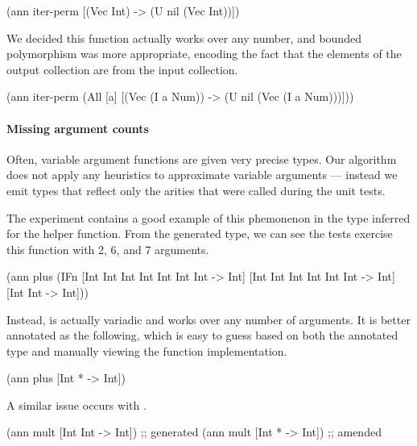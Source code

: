 \begin{cljlisting}
(ann iter-perm [(Vec Int) -> (U nil (Vec Int))])
\end{cljlisting}

We decided this function actually works over any number,
and bounded polymorphism was more appropriate, encoding
the fact that the elements of the output collection
are from the input collection.

\begin{cljlisting}
(ann iter-perm
  (All [a]
    [(Vec (I a Num)) -> (U nil (Vec (I a Num)))]))
\end{cljlisting}
%

\paragraph{Missing argument counts}
Often, variable argument functions are given very precise types.
Our algorithm does not apply any heuristics to approximate
variable arguments --- instead we emit types that reflect
only the arities that were called during the unit tests.

The  experiment contains
a good example of this phemonenon in the type inferred
for the  helper function.
From the generated type, we can see the tests exercise this function with 2, 6,
and 7 arguments.

\begin{cljlisting}
(ann plus (IFn [Int Int Int Int Int Int Int -> Int]
               [Int Int Int Int Int Int -> Int]
               [Int Int -> Int]))
\end{cljlisting}

Instead,  is actually variadic and works over any number of arguments.
It is better annotated as the following, which is easy to guess based on
both the annotated type and manually viewing the function implementation.

\begin{cljlisting}
(ann plus [Int * -> Int])
\end{cljlisting}

A similar issue occurs with .

\begin{cljlisting}
(ann mult [Int Int -> Int]) ;; generated
(ann mult [Int * -> Int])   ;; amended
\end{cljlisting}

